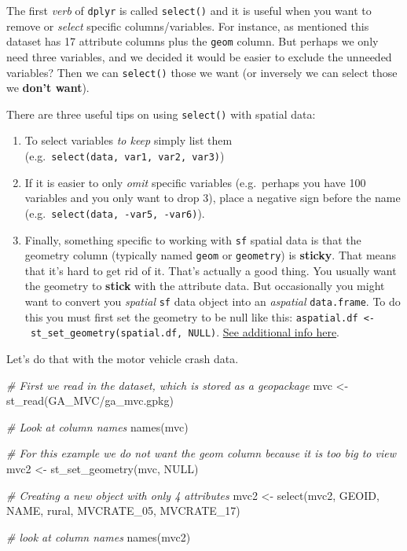 \documentclass[
]{book}
\newenvironment{Shaded}{\begin{snugshade}}{\end{snugshade}}
\newcommand{\CommentTok}[1]{\textcolor[rgb]{0.56,0.35,0.01}{\textit{#1}}}
\newcommand{\ConstantTok}[1]{\textcolor[rgb]{0.00,0.00,0.00}{#1}}
\newcommand{\FunctionTok}[1]{\textcolor[rgb]{0.00,0.00,0.00}{#1}}
\newcommand{\NormalTok}[1]{#1}
\newcommand{\OtherTok}[1]{\textcolor[rgb]{0.56,0.35,0.01}{#1}}
\newcommand{\StringTok}[1]{\textcolor[rgb]{0.31,0.60,0.02}{#1}}
\providecommand{\tightlist}{%
  \setlength{\itemsep}{0pt}\setlength{\parskip}{0pt}}
\begin{document}
The first \emph{verb} of \texttt{dplyr} is called \texttt{select()} and it is useful when you want to remove or \emph{select} specific columns/variables. For instance, as mentioned this dataset has 17 attribute columns plus the \texttt{geom} column. But perhaps we only need three variables, and we decided it would be easier to exclude the unneeded variables? Then we can \texttt{select()} those we want (or inversely we can select those we \textbf{don't want}).

There are three useful tips on using \texttt{select()} with spatial data:

\begin{enumerate}
\def\labelenumi{\arabic{enumi}.}
\tightlist
\item
  To select variables \emph{to keep} simply list them (e.g.~\texttt{select(data,\ var1,\ var2,\ var3)})
\item
  If it is easier to only \emph{omit} specific variables (e.g.~perhaps you have 100 variables and you only want to drop 3), place a negative sign before the name (e.g.~\texttt{select(data,\ -var5,\ -var6)}).
\item
  Finally, something specific to working with \texttt{sf} spatial data is that the geometry column (typically named \texttt{geom} or \texttt{geometry}) is \textbf{sticky}. That means that it's hard to get rid of it. That's actually a good thing. You usually want the geometry to \textbf{stick} with the attribute data. But occasionally you might want to convert you \emph{spatial} \texttt{sf} data object into an \emph{aspatial} \texttt{data.frame}. To do this you must first set the geometry to be null like this: \texttt{aspatial.df\ \textless{}-\ st\_set\_geometry(spatial.df,\ NULL)}. \protect\hyperlink{sf-overview}{See additional info here}.
\end{enumerate}

Let's do that with the motor vehicle crash data.

\begin{Shaded}
\begin{Highlighting}[]
\CommentTok{\# First we read in the dataset, which is stored as a geopackage}
\NormalTok{mvc }\OtherTok{\textless{}{-}} \FunctionTok{st\_read}\NormalTok{(}\StringTok{\textquotesingle{}GA\_MVC/ga\_mvc.gpkg\textquotesingle{}}\NormalTok{)}

\CommentTok{\# Look at column names}
\FunctionTok{names}\NormalTok{(mvc)}

\CommentTok{\# For this example we do not want the geom column because it is too big to view}
\NormalTok{mvc2 }\OtherTok{\textless{}{-}} \FunctionTok{st\_set\_geometry}\NormalTok{(mvc, }\ConstantTok{NULL}\NormalTok{)}

\CommentTok{\# Creating a new object with only 4 attributes}
\NormalTok{mvc2 }\OtherTok{\textless{}{-}} \FunctionTok{select}\NormalTok{(mvc2, GEOID, NAME, rural, MVCRATE\_05, MVCRATE\_17)}

\CommentTok{\# look at column names}
\FunctionTok{names}\NormalTok{(mvc2)}
\end{Highlighting}
\end{Shaded}
\end{document}
